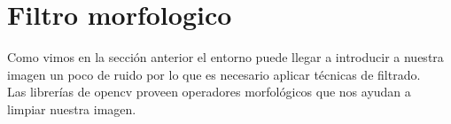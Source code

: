 
\section{Filtro morfologico}
Como vimos en la sección anterior el entorno puede llegar a introducir a nuestra
imagen un poco de ruido por lo que es necesario aplicar técnicas de filtrado.\\
Las librerías de opencv proveen operadores morfológicos que nos ayudan a limpiar
nuestra imagen.
